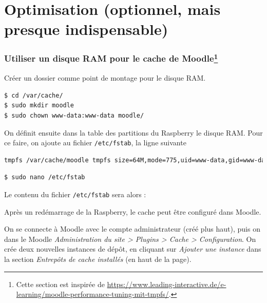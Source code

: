 \documentclass[11pt]{article}
\begin{document}
\section{Optimisation (optionnel, mais presque indispensable)}

\subsubsection[Utiliser un disque RAM pour le cache de Moodle]{Utiliser un disque RAM pour le cache de Moodle\footnote{Cette section est inspirée de \url{https://www.leading-interactive.de/e-learning/moodle-performance-tuning-mit-tmpfs/}.}}

Créer un dossier comme point de montage pour le disque RAM.
\begin{lstlisting}[language=bash]
$ cd /var/cache/
$ sudo mkdir moodle
$ sudo chown www-data:www-data moodle/
\end{lstlisting}

On définit ensuite dans la table des partitions du Raspberry le disque RAM. Pour ce faire, on ajoute au fichier \lstinline{/etc/fstab}, la ligne suivante
\begin{lstlisting}[language=bash]
tmpfs /var/cache/moodle tmpfs size=64M,mode=775,uid=www-data,gid=www-data 0 0
\end{lstlisting}

\begin{lstlisting}[language=bash]
$ sudo nano /etc/fstab
\end{lstlisting}

Le contenu du fichier \lstinline{/etc/fstab} sera alors : 


Après un redémarrage de la Raspberry, le cache peut être configuré dans Moodle.

On se connecte à Moodle avec le compte administrateur (créé plus haut), puis on dans le Moodle \emph{Administration du site > Plugins > Cache > Configuration}. On crée deux nouvelles instances de dépôt, en cliquant sur \emph{Ajouter une instance} dans la section \emph{Entrepôts de cache installés} (en haut de la page).
\end{document}
